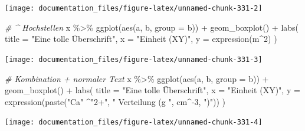 \documentclass[
]{article}
\newenvironment{Shaded}{\begin{snugshade}}{\end{snugshade}}
\newcommand{\AttributeTok}[1]{\textcolor[rgb]{0.77,0.63,0.00}{#1}}
\newcommand{\CommentTok}[1]{\textcolor[rgb]{0.56,0.35,0.01}{\textit{#1}}}
\newcommand{\DecValTok}[1]{\textcolor[rgb]{0.00,0.00,0.81}{#1}}
\newcommand{\FunctionTok}[1]{\textcolor[rgb]{0.00,0.00,0.00}{#1}}
\newcommand{\NormalTok}[1]{#1}
\newcommand{\SpecialCharTok}[1]{\textcolor[rgb]{0.00,0.00,0.00}{#1}}
\newcommand{\StringTok}[1]{\textcolor[rgb]{0.31,0.60,0.02}{#1}}
\begin{document}
\begin{center}\texttt{[image: documentation\_files/figure-latex/unnamed-chunk-331-2]} \end{center}

\begin{Shaded}
\begin{Highlighting}[]

\CommentTok{\# \^{} Hochstellen}
\NormalTok{x }\SpecialCharTok{\%\textgreater{}\%}
  \FunctionTok{ggplot}\NormalTok{(}\FunctionTok{aes}\NormalTok{(a, b, }\AttributeTok{group =}\NormalTok{ b)) }\SpecialCharTok{+}
  \FunctionTok{geom\_boxplot}\NormalTok{() }\SpecialCharTok{+}
  \FunctionTok{labs}\NormalTok{(}
    \AttributeTok{title =} \StringTok{"Eine tolle Überschrift"}\NormalTok{,}
    \AttributeTok{x =} \StringTok{"Einheit (XY)"}\NormalTok{,}
    \AttributeTok{y =} \FunctionTok{expression}\NormalTok{(m}\SpecialCharTok{\^{}}\DecValTok{2}\NormalTok{)}
\NormalTok{  )}
\end{Highlighting}
\end{Shaded}

\begin{center}\texttt{[image: documentation\_files/figure-latex/unnamed-chunk-331-3]} \end{center}

\begin{Shaded}
\begin{Highlighting}[]

\CommentTok{\# Kombination + normaler Text}
\NormalTok{x }\SpecialCharTok{\%\textgreater{}\%}
  \FunctionTok{ggplot}\NormalTok{(}\FunctionTok{aes}\NormalTok{(a, b, }\AttributeTok{group =}\NormalTok{ b)) }\SpecialCharTok{+}
  \FunctionTok{geom\_boxplot}\NormalTok{() }\SpecialCharTok{+}
  \FunctionTok{labs}\NormalTok{(}
    \AttributeTok{title =} \StringTok{"Eine tolle Überschrift"}\NormalTok{,}
    \AttributeTok{x =} \StringTok{"Einheit (XY)"}\NormalTok{,}
    \AttributeTok{y =} \FunctionTok{expression}\NormalTok{(}\FunctionTok{paste}\NormalTok{(}\StringTok{"Ca"} \SpecialCharTok{\^{}}\StringTok{"2+"}\NormalTok{, }\StringTok{" Verteilung (g "}\NormalTok{, cm}\SpecialCharTok{\^{}{-}}\DecValTok{3}\NormalTok{, }\StringTok{")"}\NormalTok{))}
\NormalTok{  )}
\end{Highlighting}
\end{Shaded}

\begin{center}\texttt{[image: documentation\_files/figure-latex/unnamed-chunk-331-4]} \end{center}
\end{document}
